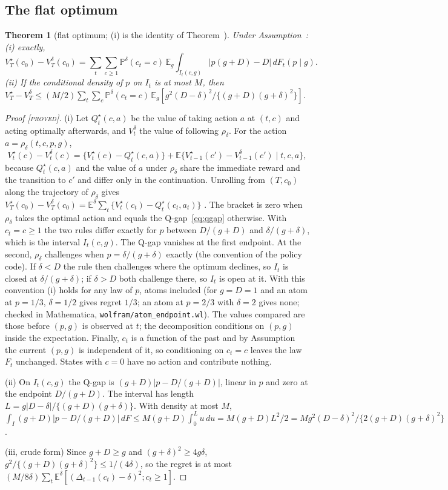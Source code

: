 \documentclass[aoas]{imsart}
\theoremstyle{plain}
\newtheorem{theorem}{Theorem}
\theoremstyle{definition}
\newcommand{\E}{\mathbb{E}}
\newcommand{\Prob}{\mathbb{P}}
\newcommand{\status}[1]{\textup{[\textsc{#1}]}}
\begin{document}
\subsection{The flat optimum}
\begin{theorem}[flat optimum; (i) is the identity of Theorem~]\label{thm:flatS}
Under Assumption~: (i) exactly,
\[ V^\star_T(c_0)-V^\delta_T(c_0)=\sum_t\sum_{c\ge1}\Prob^\delta(c_t=c)\,\E_g\int_{I_t(c,g)}|p(g+D)-D|\,dF_t(p\mid g). \]
(ii) If the conditional density of $p$ on $I_t$ is at most $M$, then $V^\star_T-V^\delta_T\le
(M/2)\sum_t\sum_c\Prob^\delta(c_t=c)\,\E_g[g^2(D-\delta)^2/\{(g+D)(g+\delta)^2\}]$.
\end{theorem}
\begin{proof}[Proof \status{proved}]
(i) Let $Q^\star_t(c,a)$ be the value of taking action $a$ at $(t,c)$ and acting optimally afterwards, and
$V^\delta_t$ the value of following $\rho_\delta$. For the action $a=\rho_\delta(t,c,p,g)$,
\[ V^\star_t(c)-V^\delta_t(c) = \{V^\star_t(c)-Q^\star_t(c,a)\}+\E\{V^\star_{t-1}(c')-V^\delta_{t-1}(c')\mid t,c,a\}, \]
because $Q^\star_t(c,a)$ and the value of $a$ under $\rho_\delta$ share the immediate reward and the transition to $c'$
and differ only in the continuation. Unrolling from $(T,c_0)$ along the trajectory of $\rho_\delta$ gives
$V^\star_T(c_0)-V^\delta_T(c_0)=\E^\delta\sum_t\{V^\star_t(c_t)-Q^\star_t(c_t,a_t)\}$
\citep{KakadeLangford2002,Puterman1994}. The bracket is zero when $\rho_\delta$ takes the optimal action and equals the
Q-gap~\eqref{eq:qgap} otherwise. With $c_t=c\ge1$ the two rules differ exactly for $p$ between $D/(g+D)$ and
$\delta/(g+\delta)$, which is the interval $I_t(c,g)$. The Q-gap vanishes at the first endpoint. At the second,
$\rho_\delta$ challenges when $p=\delta/(g+\delta)$ exactly (the convention of the policy code). If $\delta<D$ the rule
then challenges where the optimum declines, so $I_t$ is closed at $\delta/(g+\delta)$; if $\delta>D$ both challenge
there, so $I_t$ is open at it. With this convention (i) holds for any law of $p$, atoms included (for $g=D=1$ and an
atom at $p=1/3$, $\delta=1/2$ gives regret $1/3$; an atom at $p=2/3$ with $\delta=2$ gives none; checked in
Mathematica, \texttt{wolfram/atom\_endpoint.wl}). The values
compared are those before $(p,g)$ is observed at $t$; the decomposition conditions on $(p,g)$ inside the expectation. Finally, $c_t$ is a function of the past and by
Assumption~ the current $(p,g)$ is independent of it, so conditioning on $c_t=c$ leaves the law $F_t$
unchanged. States with $c=0$ have no action and contribute nothing.

(ii) On $I_t(c,g)$ the Q-gap is $(g+D)|p-D/(g+D)|$, linear in $p$ and zero at the endpoint $D/(g+D)$. The interval has
length $L=g|D-\delta|/\{(g+D)(g+\delta)\}$. With density at most $M$,
$\int_I(g+D)|p-D/(g+D)|\,dF\le M(g+D)\int_0^Lu\,du=M(g+D)L^2/2=Mg^2(D-\delta)^2/\{2(g+D)(g+\delta)^2\}$.

(iii, crude form) Since $g+D\ge g$ and $(g+\delta)^2\ge4g\delta$, $g^2/\{(g+D)(g+\delta)^2\}\le1/(4\delta)$, so the
regret is at most $(M/8\delta)\sum_t\E^\delta[(\Delta_{t-1}(c_t)-\delta)^2;c_t\ge1]$.
\end{proof}
\end{document}
